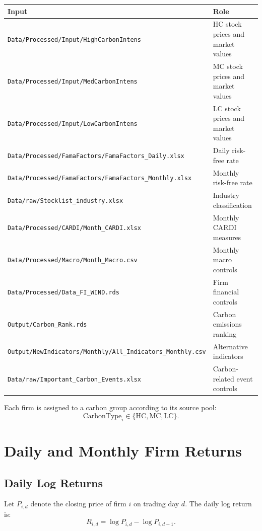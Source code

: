 \documentclass[11pt]{article}
\begin{document}
\begin{longtable}{p{}p{}}
\toprule
Input & Role\\
\midrule
\texttt{Data/Processed/Input/HighCarbonIntens} & HC stock prices and market values\\
\texttt{Data/Processed/Input/MedCarbonIntens} & MC stock prices and market values\\
\texttt{Data/Processed/Input/LowCarbonIntens} & LC stock prices and market values\\
\texttt{Data/Processed/FamaFactors/FamaFactors\_Daily.xlsx} & Daily risk-free rate\\
\texttt{Data/Processed/FamaFactors/FamaFactors\_Monthly.xlsx} & Monthly risk-free rate\\
\texttt{Data/raw/Stocklist\_industry.xlsx} & Industry classification\\
\texttt{Data/Processed/CARDI/Month\_CARDI.xlsx} & Monthly CARDI measures\\
\texttt{Data/Processed/Macro/Month\_Macro.csv} & Monthly macro controls\\
\texttt{Data/Processed/Data\_FI\_WIND.rds} & Firm financial controls\\
\texttt{Output/Carbon\_Rank.rds} & Carbon emissions ranking\\
\texttt{Output/NewIndicators/Monthly/All\_Indicators\_Monthly.csv} & Alternative indicators\\
\texttt{Data/raw/Important\_Carbon\_Events.xlsx} & Carbon-related event controls\\
\bottomrule
\end{longtable}

Each firm is assigned to a carbon group according to its source pool:
\[
\text{CarbonType}_i \in \{\mathrm{HC},\mathrm{MC},\mathrm{LC}\}.
\]

\section{Daily and Monthly Firm Returns}

\subsection{Daily Log Returns}

Let \(P_{i,d}\) denote the closing price of firm \(i\) on trading day \(d\).
The daily log return is:
\begin{equation}
R_{i,d}
=
\log P_{i,d} - \log P_{i,d-1}.
\end{equation}
\end{document}
